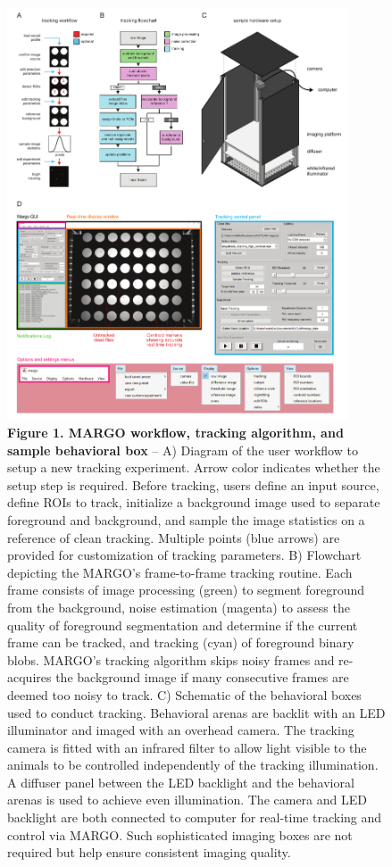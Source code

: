 \documentclass[10pt]{article}
\begin{document}
\newpage
\begin{figure}[h!]
	\begin{center}
		\includegraphics[width=0.9\textwidth]{../figures/autotracker_overview.pdf}
	\end{center}
	\caption*{\footnotesize \textbf{Figure 1. MARGO workflow, tracking algorithm, and sample behavioral box} -- A) Diagram of the user workflow to setup a new tracking experiment. Arrow color indicates whether the setup step is required. Before tracking, users define an input source, define ROIs to track, initialize a background image used to separate foreground and background, and sample the image statistics on a reference of clean tracking. Multiple points (blue arrows) are provided for customization of tracking parameters. B) Flowchart depicting the MARGO's frame-to-frame tracking routine. Each frame consists of image processing (green) to segment foreground from the background, noise estimation (magenta) to assess the quality of foreground segmentation and determine if the current frame can be tracked, and tracking (cyan) of foreground binary blobs. MARGO's tracking algorithm skips noisy frames and re-acquires the background image if many consecutive frames are deemed too noisy to track. C) Schematic of the behavioral boxes used to conduct tracking. Behavioral arenas are backlit with an LED illuminator and imaged with an overhead camera. The tracking camera is fitted with an infrared filter to allow light visible to the animals to be controlled independently of the tracking illumination. A diffuser panel between the LED backlight and the behavioral arenas is used to achieve even illumination. The camera and LED backlight are both connected to computer for real-time tracking and control via MARGO. Such sophisticated imaging boxes are not required but help ensure consistent imaging quality.}
\end{figure}
\end{document}

